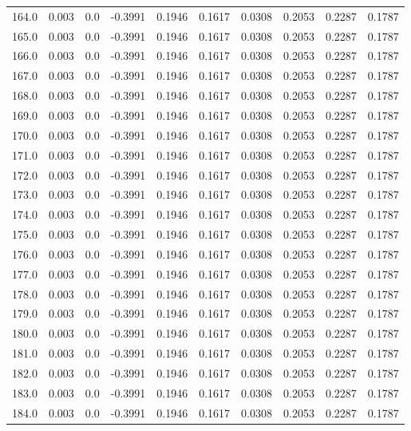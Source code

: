 \begin{longtable}{lrrrrrrrrr}
164.0 & 0.003 & 0.0 & -0.3991 & 0.1946 & 0.1617 & 0.0308 & 0.2053 & 0.2287 & 0.1787 \\
165.0 & 0.003 & 0.0 & -0.3991 & 0.1946 & 0.1617 & 0.0308 & 0.2053 & 0.2287 & 0.1787 \\
166.0 & 0.003 & 0.0 & -0.3991 & 0.1946 & 0.1617 & 0.0308 & 0.2053 & 0.2287 & 0.1787 \\
167.0 & 0.003 & 0.0 & -0.3991 & 0.1946 & 0.1617 & 0.0308 & 0.2053 & 0.2287 & 0.1787 \\
168.0 & 0.003 & 0.0 & -0.3991 & 0.1946 & 0.1617 & 0.0308 & 0.2053 & 0.2287 & 0.1787 \\
169.0 & 0.003 & 0.0 & -0.3991 & 0.1946 & 0.1617 & 0.0308 & 0.2053 & 0.2287 & 0.1787 \\
170.0 & 0.003 & 0.0 & -0.3991 & 0.1946 & 0.1617 & 0.0308 & 0.2053 & 0.2287 & 0.1787 \\
171.0 & 0.003 & 0.0 & -0.3991 & 0.1946 & 0.1617 & 0.0308 & 0.2053 & 0.2287 & 0.1787 \\
172.0 & 0.003 & 0.0 & -0.3991 & 0.1946 & 0.1617 & 0.0308 & 0.2053 & 0.2287 & 0.1787 \\
173.0 & 0.003 & 0.0 & -0.3991 & 0.1946 & 0.1617 & 0.0308 & 0.2053 & 0.2287 & 0.1787 \\
174.0 & 0.003 & 0.0 & -0.3991 & 0.1946 & 0.1617 & 0.0308 & 0.2053 & 0.2287 & 0.1787 \\
175.0 & 0.003 & 0.0 & -0.3991 & 0.1946 & 0.1617 & 0.0308 & 0.2053 & 0.2287 & 0.1787 \\
176.0 & 0.003 & 0.0 & -0.3991 & 0.1946 & 0.1617 & 0.0308 & 0.2053 & 0.2287 & 0.1787 \\
177.0 & 0.003 & 0.0 & -0.3991 & 0.1946 & 0.1617 & 0.0308 & 0.2053 & 0.2287 & 0.1787 \\
178.0 & 0.003 & 0.0 & -0.3991 & 0.1946 & 0.1617 & 0.0308 & 0.2053 & 0.2287 & 0.1787 \\
179.0 & 0.003 & 0.0 & -0.3991 & 0.1946 & 0.1617 & 0.0308 & 0.2053 & 0.2287 & 0.1787 \\
180.0 & 0.003 & 0.0 & -0.3991 & 0.1946 & 0.1617 & 0.0308 & 0.2053 & 0.2287 & 0.1787 \\
181.0 & 0.003 & 0.0 & -0.3991 & 0.1946 & 0.1617 & 0.0308 & 0.2053 & 0.2287 & 0.1787 \\
182.0 & 0.003 & 0.0 & -0.3991 & 0.1946 & 0.1617 & 0.0308 & 0.2053 & 0.2287 & 0.1787 \\
183.0 & 0.003 & 0.0 & -0.3991 & 0.1946 & 0.1617 & 0.0308 & 0.2053 & 0.2287 & 0.1787 \\
184.0 & 0.003 & 0.0 & -0.3991 & 0.1946 & 0.1617 & 0.0308 & 0.2053 & 0.2287 & 0.1787 \\

\end{longtable}

